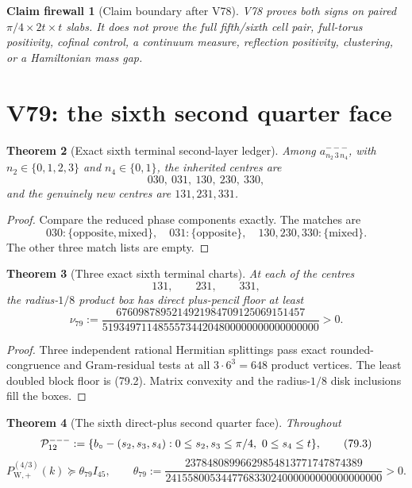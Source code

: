 \documentclass[11pt,oneside]{article}
\newtheorem{theorem}{Theorem}[section]
\newtheorem{firewall}[theorem]{Claim firewall}
\theoremstyle{definition}
\theoremstyle{remark}
\begin{document}
\begin{firewall}[Claim boundary after V78]
\label{fire:newv78-final}
V78 proves both signs on paired \(\pi/4\times2t\times t\) slabs.
It does not prove the full fifth/sixth cell pair, full-torus
positivity, cofinal control, a continuum measure, reflection
positivity, clustering, or a Hamiltonian mass gap.
\end{firewall}

\section{V79: the sixth second quarter face}
\label{sec:newv79-sixth-second-face}

\begin{theorem}[Exact sixth terminal second-layer ledger]
\label{thm:newv79-intersections}
Among \(a^{---}_{n_2\,3\,n_4}\), with
\(n_2\in\{0,1,2,3\}\) and \(n_4\in\{0,1\}\), the inherited centres
are
\[
 030,\ 031,\ 130,\ 230,\ 330,                          \tag{79.1}
\]
and the genuinely new centres are \(131,231,331\).
\end{theorem}

\begin{proof}
Compare the reduced phase components exactly.  The matches are
\[
 030:\{\mathrm{opposite},\mathrm{mixed}\},\quad
 031:\{\mathrm{opposite}\},\quad
 130,230,330:\{\mathrm{mixed}\}.
\]
The other three match lists are empty.
\end{proof}

\begin{theorem}[Three exact sixth terminal charts]
\label{thm:newv79-three-charts}
At each of the centres
\[
 131,\qquad231,\qquad331,
\]
the radius-\(1/8\) product box has direct plus-pencil floor at least
\[
 \nu_{79}:=
 \frac{6760987895214921984709125069151457}
 {519349711485557344204800000000000000000}>0.          \tag{79.2}
\]
\end{theorem}

\begin{proof}
Three independent rational Hermitian splittings pass exact
rounded-congruence and Gram-residual tests at all
\(3\cdot6^3=648\) product vertices.  The least doubled block floor
is (79.2).  Matrix convexity and the radius-\(1/8\) disk inclusions
fill the boxes.
\end{proof}

\begin{theorem}[The sixth direct-plus second quarter face]
\label{thm:newv79-second-face}
Throughout
\[
 {\cal P}^{---}_{12}:=
 \{b_\circ-(s_2,s_3,s_4):
 0\le s_2,s_3\le\pi/4,\ 0\le s_4\le t\},              \tag{79.3}
\]
\[
 P_{\mathrm W,+}^{(4/3)}(k)
 \succeq\theta_{79}I_{45},\qquad
 \theta_{79}:=
 \frac{23784808996629854813771747874389}
 {241558005344776833024000000000000000000}>0.          \tag{79.4}
\]
\end{theorem}
\end{document}
